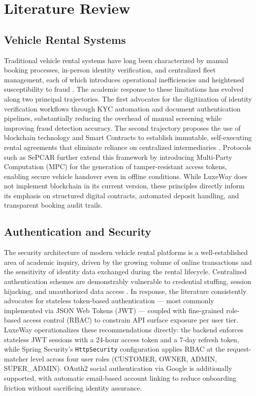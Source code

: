 \section{Literature Review}

\subsection{Vehicle Rental Systems}

Traditional vehicle rental systems have long been characterized by manual booking processes, in-person identity verification, and centralized fleet management, each of which introduces operational inefficiencies and heightened susceptibility to fraud \cite{gupta2025double}. The academic response to these limitations has evolved along two principal trajectories. The first advocates for the digitization of identity verification workflows through KYC automation and document authentication pipelines, substantially reducing the overhead of manual screening while improving fraud detection accuracy. The second trajectory proposes the use of blockchain technology and Smart Contracts to establish immutable, self-executing rental agreements that eliminate reliance on centralized intermediaries \cite{madhusudan2019applying}. Protocols such as SePCAR further extend this framework by introducing Multi-Party Computation (MPC) for the generation of tamper-resistant access tokens, enabling secure vehicle handover even in offline conditions. While LuxeWay does not implement blockchain in its current version, these principles directly inform its emphasis on structured digital contracts, automated deposit handling, and transparent booking audit trails.

\subsection{Authentication and Security}

The security architecture of modern vehicle rental platforms is a well-established area of academic inquiry, driven by the growing volume of online transactions and the sensitivity of identity data exchanged during the rental lifecycle. Centralized authentication schemes are demonstrably vulnerable to credential stuffing, session hijacking, and unauthorized data access \cite{gupta2025double}. In response, the literature consistently advocates for stateless token-based authentication --- most commonly implemented via JSON Web Tokens (JWT) --- coupled with fine-grained role-based access control (RBAC) to constrain API surface exposure per user tier. LuxeWay operationalizes these recommendations directly: the backend enforces stateless JWT sessions with a 24-hour access token and a 7-day refresh token, while Spring Security's \texttt{HttpSecurity} configuration applies RBAC at the request-matcher level across four user roles (CUSTOMER, OWNER, ADMIN, SUPER\_ADMIN). OAuth2 social authentication via Google is additionally supported, with automatic email-based account linking to reduce onboarding friction without sacrificing identity assurance.


